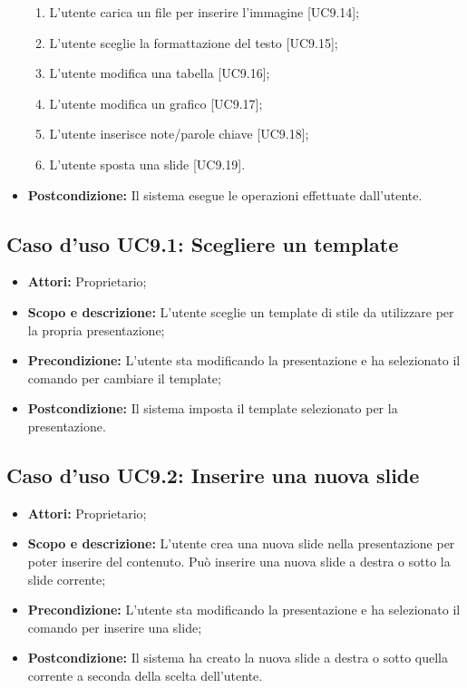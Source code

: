 \begin{itemize}
\begin{enumerate}
		\item L'utente carica un file per inserire l'immagine [UC9.14];

		\item L'utente sceglie la formattazione del testo [UC9.15];

		\item L'utente modifica una tabella [UC9.16];

		\item L'utente modifica un grafico [UC9.17];
		
		\item L'utente inserisce note/parole chiave [UC9.18];
		
		\item L'utente sposta una \gls{slide} [UC9.19].
	\end{enumerate}
	\item \textbf{Postcondizione:} Il sistema esegue le operazioni effettuate dall'utente.
\end{itemize}


\subsection{Caso d'uso UC9.1: Scegliere un template}
\begin{itemize}
	\item \textbf{Attori:} Proprietario;
	\item \textbf{Scopo e descrizione:} L'utente sceglie un \gls{template} di stile da utilizzare per la propria presentazione;
	\item \textbf{Precondizione:} L'utente sta modificando la presentazione e ha selezionato il comando per cambiare il \gls{template};
	\item \textbf{Postcondizione:} Il sistema imposta il \gls{template} selezionato per la presentazione.
\end{itemize}


\subsection{Caso d'uso UC9.2: Inserire una nuova slide}
\begin{itemize}
	\item \textbf{Attori:} Proprietario;
	\item \textbf{Scopo e descrizione:} L'utente crea una nuova \gls{slide} nella presentazione per poter inserire del contenuto. Può inserire una nuova \gls{slide} a destra o sotto la \gls{slide} corrente;
	\item \textbf{Precondizione:} L'utente sta modificando la presentazione e ha selezionato il comando per inserire una \gls{slide};
	\item \textbf{Postcondizione:} Il sistema ha creato la nuova \gls{slide} a destra o sotto quella corrente a seconda della scelta dell'utente.
\end{itemize}


